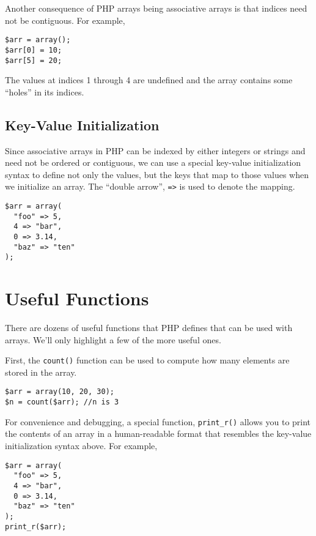 Another consequence of PHP arrays being associative
arrays is that indices need not be contiguous.  For example,

\begin{verbatim}
$arr = array();
$arr[0] = 10;
$arr[5] = 20;
\end{verbatim}

The values at indices 1 through 4 are undefined and the
array contains some ``holes'' in its indices.  

\subsection{Key-Value Initialization}

Since associative arrays in PHP can be indexed by
either integers or strings and need not be ordered or
contiguous, we can use a special key-value initialization
syntax to define not only the values, but the keys that
map to those values when we initialize an array.  The
``double arrow'', \texttt{=>} is used to denote
the mapping.

\begin{verbatim}
$arr = array(
  "foo" => 5,
  4 => "bar",
  0 => 3.14,
  "baz" => "ten"
);
\end{verbatim}

\section{Useful Functions}

There are dozens of useful functions that PHP defines that can
be used with arrays.  We'll only highlight a few of the more
useful ones. 

First, the \texttt{count()} function can be used to
compute how many elements are stored in the array.

\begin{verbatim}
$arr = array(10, 20, 30);
$n = count($arr); //n is 3
\end{verbatim}

For convenience and debugging, a special function, 
\texttt{print_r()} allows you to print the
contents of an array in a human-readable format 
that resembles the key-value initialization syntax
above.  For example, 

\begin{verbatim}
$arr = array(
  "foo" => 5,
  4 => "bar",
  0 => 3.14,
  "baz" => "ten"
);
print_r($arr);  
\end{verbatim}

